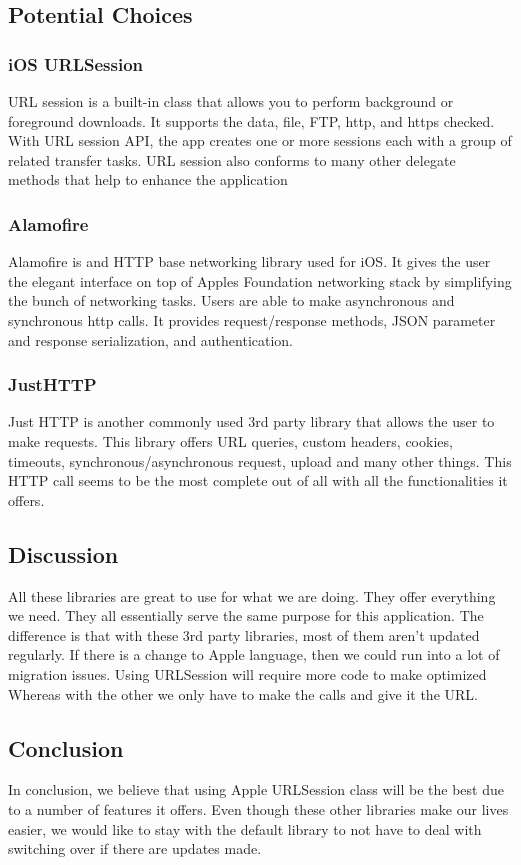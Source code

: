 \documentclass[onecolumn, draftclsnofoot,10pt, compsoc]{IEEEtran}
\begin{document}
\subsection{Potential Choices}
\subsubsection{iOS URLSession \cite{URLSession}}
\par URL session is a built-in class that allows you to perform background or foreground downloads. It supports the data, file, FTP, http, and https checked. With URL session API, the app creates one or more sessions each with a group of related transfer tasks. URL session also conforms to many other delegate methods that help to enhance the application

\subsubsection{Alamofire\cite{Alamofire}}
\par Alamofire is and HTTP base networking library used for iOS. It gives the user the elegant interface on top of Apples Foundation networking stack by simplifying the bunch of networking tasks. Users are able to make asynchronous and synchronous http calls. It provides request/response methods, JSON parameter and response serialization, and authentication.

\subsubsection{JustHTTP\cite{JustHTTP}}
\par Just HTTP is another commonly used 3rd party library that allows the user to make requests. This library offers URL queries, custom headers, cookies, timeouts, synchronous/asynchronous request, upload and many other things. This HTTP call seems to be the most complete out of all with all the functionalities it offers. 

\subsection{Discussion}
All these libraries are great to use for what we are doing. They offer everything we need. They all essentially serve the same purpose for this application. The difference is that with these 3rd party libraries, most of them aren't updated regularly. If there is a change to Apple language, then we could run into a lot of migration issues. Using URLSession will require more code to make optimized Whereas with the other we only have to make the calls and give it the URL.

\subsection{Conclusion}
In conclusion, we believe that using Apple URLSession class will be the best due to a number of features it offers. Even though these other libraries make our lives easier, we would like to stay with the default library to not have to deal with switching over if there are updates made. 



\end{document}
